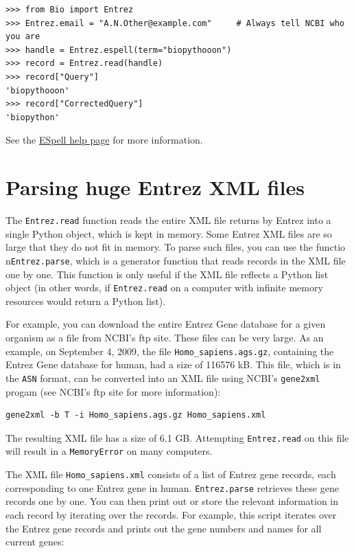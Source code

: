 \documentclass{report}
\begin{document}
\begin{verbatim}
>>> from Bio import Entrez
>>> Entrez.email = "A.N.Other@example.com"     # Always tell NCBI who you are
>>> handle = Entrez.espell(term="biopythooon")
>>> record = Entrez.read(handle)
>>> record["Query"]
'biopythooon'
>>> record["CorrectedQuery"]
'biopython'
\end{verbatim}
See the \href{http://www.ncbi.nlm.nih.gov/entrez/query/static/espell\_help.html}{ESpell help page} for more information.

\section{Parsing huge Entrez XML files}

The \verb+Entrez.read+ function reads the entire XML file returns by Entrez into a single Python object, which is kept in memory. Some Entrez XML files are so large that they do not fit in memory. To parse such files, you can use the functio n\verb+Entrez.parse+, which is a generator function that reads records in the XML file one by one. This function is only useful if the XML file reflects a Python list object (in other words, if \verb+Entrez.read+ on a computer with infinite memory resources would return a Python list).

For example, you can download the entire Entrez Gene database for a given organism as a file from NCBI's ftp site. These files can be very large. As an example, on September 4, 2009, the file \verb+Homo_sapiens.ags.gz+, containing the Entrez Gene database for human, had a size of 116576 kB. This file, which is in the \verb+ASN+ format, can be converted into an XML file using NCBI's \verb+gene2xml+ progam (see NCBI's ftp site for more information):

\begin{verbatim}
gene2xml -b T -i Homo_sapiens.ags.gz Homo_sapiens.xml
\end{verbatim}

The resulting XML file has a size of 6.1 GB. Attempting \verb+Entrez.read+ on this file will result in a \verb+MemoryError+ on many computers.

The XML file \verb+Homo_sapiens.xml+ consists of a list of Entrez gene records, each corresponding to one Entrez gene in human. \verb+Entrez.parse+ retrieves these gene records one by one. You can then print out or store the relevant information in each record by iterating over the records. For example, this script iterates over the Entrez gene records and prints out the gene numbers and names for all current genes:
\end{document}
